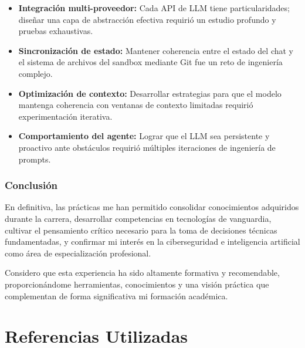 \documentclass[12pt,a4paper]{article}
\begin{document}
\begin{itemize}
    \item \textbf{Integración multi-proveedor:} Cada API de LLM tiene particularidades; diseñar una capa de abstracción efectiva requirió un estudio profundo y pruebas exhaustivas.
    
    \item \textbf{Sincronización de estado:} Mantener coherencia entre el estado del chat y el sistema de archivos del sandbox mediante Git fue un reto de ingeniería complejo.
    
    \item \textbf{Optimización de contexto:} Desarrollar estrategias para que el modelo mantenga coherencia con ventanas de contexto limitadas requirió experimentación iterativa.
    
    \item \textbf{Comportamiento del agente:} Lograr que el LLM sea persistente y proactivo ante obstáculos requirió múltiples iteraciones de ingeniería de prompts.
\end{itemize}

\subsubsection{Conclusión}

En definitiva, las prácticas me han permitido consolidar conocimientos adquiridos durante la carrera, desarrollar competencias en tecnologías de vanguardia, cultivar el pensamiento crítico necesario para la toma de decisiones técnicas fundamentadas, y confirmar mi interés en la ciberseguridad e inteligencia artificial como área de especialización profesional.

Considero que esta experiencia ha sido altamente formativa y recomendable, proporcionándome herramientas, conocimientos y una visión práctica que complementan de forma significativa mi formación académica.

\newpage

\section{Referencias Utilizadas}
\end{document}
